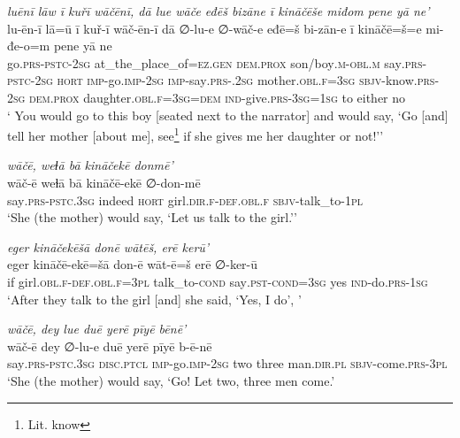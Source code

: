 \ea \label{ŽE.74}
\textit{luēnī lāw ī kuřī wāčēnī, dā lue wāče eđēš bizāne ī kināčēše miđom pene yā ne’} \\ 
\gll lu-ēn-ī lā=ū ī kuř-ī wāč-ēn-ī dā ∅-lu-e ∅-wāč-e eđē=š bi-zān-e ī kināčē=š=e mi-đe-o=m pene yā ne \\ 
 go\textsc{.prs}\textsc{-pstc}-\textsc{2sg} at\_the\_place\_of\textsc{\textsc{=ez.gen}} \textsc{dem.prox} son/boy\textsc{.m}\textsc{-obl}\textsc{.m} say\textsc{.prs}\textsc{-pstc}-\textsc{2sg} \textsc{hort} \textsc{imp-}go.\textsc{imp-}\textsc{2sg} \textsc{imp-}say\textsc{.prs-}.\textsc{2sg} mother\textsc{.obl}\textsc{.f}\textsc{=3sg} \textsc{sbjv-}know\textsc{.prs}-\textsc{2sg} \textsc{dem.prox} daughter\textsc{.obl}\textsc{.f}\textsc{=3sg}\textsc{=dem} \textsc{ind-}give\textsc{.prs}\textsc{-3sg}\textsc{=\textsc{1sg}} to either no \\ 
\glt ` You would go to this boy [seated next to the narrator] and would say, ‘Go [and] tell her mother [about me], see\footnote{Lit. know} if she gives me her daughter or not!’'
\z 
 
\ea \label{ŽE.76}
\textit{wāčē, weɫā bā kināčekē donmē’} \\ 
\gll wāč-ē weɫā bā kināčē-ekē ∅-don-mē \\ 
 say\textsc{.prs-pstc}\textsc{.3sg} indeed \textsc{hort} girl\textsc{.dir}\textsc{.f}\textsc{-def}\textsc{.obl}\textsc{.f} \textsc{sbjv-}talk\_to\textsc{-1pl} \\ 
\glt `She (the mother) would say, ‘Let us talk to the girl.’'
\z 
 
\ea \label{ŽE.77}
\textit{eger kināčekēšā donē wātēš, erē kerū’} \\ 
\gll eger kināčē-ekē=šā don-ē wāt-ē=š erē ∅-ker-ū \\ 
 if girl\textsc{.obl}\textsc{.f}\textsc{-def}\textsc{.obl}\textsc{.f}\textsc{=3pl} talk\_to\textsc{-cond} say\textsc{.pst}\textsc{-cond}\textsc{=3sg} yes \textsc{ind-}do\textsc{.prs}\textsc{-\textsc{1sg}} \\ 
\glt `After they talk to the girl [and] she said, ‘Yes, I do’, '
\z 
 
\ea \label{ŽE.78}
\textit{wāčē, dey lue duē yerē pīyē bēnē’} \\ 
\gll wāč-ē dey ∅-lu-e duē yerē pīyē b-ē-nē \\ 
 say\textsc{.prs-pstc}\textsc{.3sg} \textsc{disc.}\textsc{ptcl} \textsc{imp-}go.\textsc{imp-}\textsc{2sg} two three man\textsc{.dir}\textsc{.pl} \textsc{sbjv-}come\textsc{.prs}\textsc{-3pl} \\ 
\glt `She (the mother) would say, ‘Go! Let two, three men come.'
\z 
 
